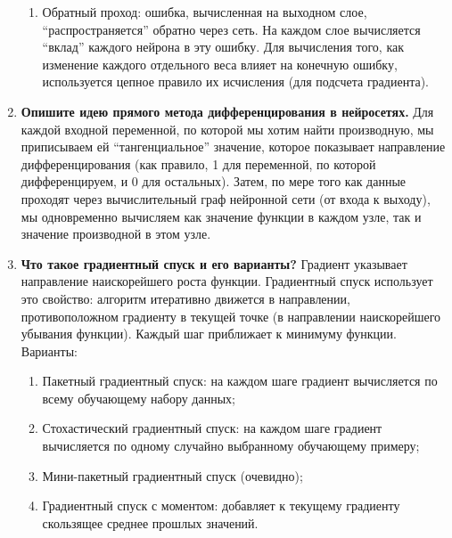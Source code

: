 \documentclass{article}
\begin{document}
\begin{enumerate}
\begin{enumerate}
        \item Обратный проход: ошибка, вычисленная на выходном слое, ``распространяется'' обратно через сеть. На каждом слое вычисляется ``вклад'' каждого нейрона в эту ошибку. Для вычисления того, как изменение каждого отдельного веса влияет на конечную ошибку, используется цепное правило их исчисления (для подсчета градиента).
    \end{enumerate}
    \item \textbf{Опишите идею прямого метода дифференцирования в нейросетях.} Для каждой входной переменной, по которой мы хотим найти производную, мы приписываем ей ``тангенциальное'' значение, которое показывает направление дифференцирования (как правило, 1 для переменной, по которой дифференцируем, и 0 для остальных). Затем, по мере того как данные проходят через вычислительный граф нейронной сети (от входа к выходу), мы одновременно вычисляем как значение функции в каждом узле, так и значение производной в этом узле.
    \item \textbf{Что такое градиентный спуск и его варианты?} Градиент указывает направление наискорейшего роста функции. Градиентный спуск использует это свойство: алгоритм итеративно движется в направлении, противоположном градиенту в текущей точке (в направлении наискорейшего убывания функции). Каждый шаг приближает к минимуму функции. \\
    Варианты: 
    \begin{enumerate}
        \item Пакетный градиентный спуск: на каждом шаге градиент вычисляется по всему обучающему набору данных; 
        \item Стохастический градиентный спуск: на каждом шаге градиент вычисляется по одному случайно выбранному обучающему примеру; 
        \item Мини-пакетный градиентный спуск (очевидно); 
        \item Градиентный спуск с моментом: добавляет к текущему градиенту скользящее среднее прошлых значений.
    \end{enumerate}
\end{enumerate}
\end{document}
